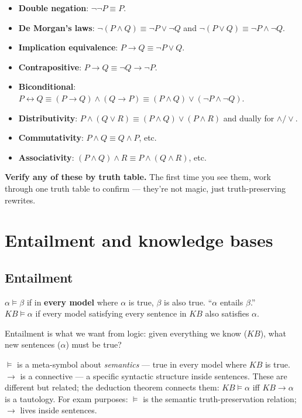 \documentclass[11pt, a4paper]{article}
\begin{document}
\begin{itemize}
  \item \textbf{Double negation}: $\neg \neg P \equiv P$.
  \item \textbf{De Morgan's laws}: $\neg(P \land Q) \equiv \neg P \lor \neg Q$ \quad and \quad $\neg(P \lor Q) \equiv \neg P \land \neg Q$.
  \item \textbf{Implication equivalence}: $P \rightarrow Q \equiv \neg P \lor Q$.
  \item \textbf{Contrapositive}: $P \rightarrow Q \equiv \neg Q \rightarrow \neg P$.
  \item \textbf{Biconditional}: $P \leftrightarrow Q \equiv (P \rightarrow Q) \land (Q \rightarrow P) \equiv (P \land Q) \lor (\neg P \land \neg Q)$.
  \item \textbf{Distributivity}: $P \land (Q \lor R) \equiv (P \land Q) \lor (P \land R)$ \quad and dually for $\land/\lor$.
  \item \textbf{Commutativity}: $P \land Q \equiv Q \land P$, etc.
  \item \textbf{Associativity}: $(P \land Q) \land R \equiv P \land (Q \land R)$, etc.
\end{itemize}

\textbf{Verify any of these by truth table.} The first time you see them, work through one truth table to confirm — they're not magic, just truth-preserving rewrites.

\section{Entailment and knowledge bases}

\subsection{Entailment}

\begin{defbox}[Entailment]
$\alpha \models \beta$ if in \textbf{every model} where $\alpha$ is true, $\beta$ is also true. ``$\alpha$ entails $\beta$.''\\[0.3em]
$KB \models \alpha$ if every model satisfying every sentence in $KB$ also satisfies $\alpha$.
\end{defbox}

Entailment is what we want from logic: given everything we know ($KB$), what new sentences ($\alpha$) must be true?

\begin{notebox}
$\models$ is a meta-symbol about \emph{semantics} — true in every model where $KB$ is true. $\rightarrow$ is a connective — a specific syntactic structure inside sentences. These are different but related; the deduction theorem connects them: $KB \models \alpha$ iff $KB \rightarrow \alpha$ is a tautology. For exam purposes: $\models$ is the semantic truth-preservation relation; $\rightarrow$ lives inside sentences.
\end{notebox}
\end{document}
